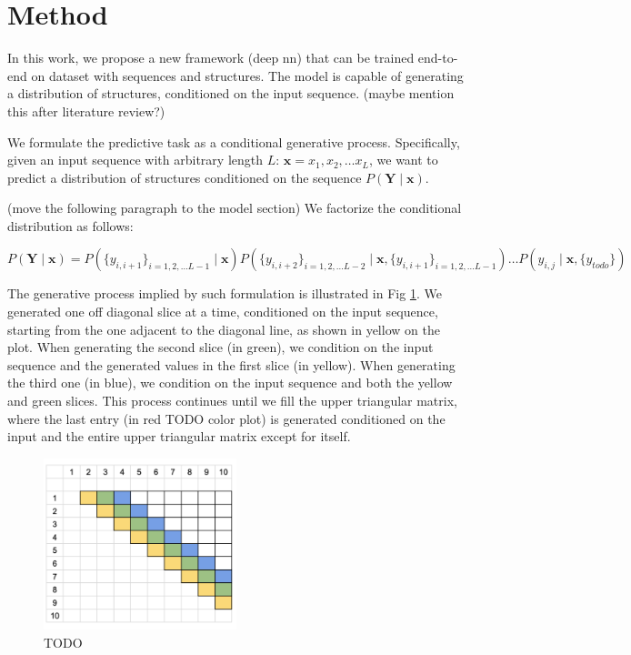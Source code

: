 \documentclass{article}
\begin{document}
\section{Method}


In this work, we propose a new framework (deep nn) that can be trained end-to-end on dataset with sequences and structures.
The model is capable of generating a distribution of structures, conditioned on the input sequence.
(maybe mention this after literature review?)

We formulate the predictive task as a conditional generative process.
Specifically, given an input sequence with arbitrary length $L$: $\bm{x} = x_1, x_2, \dots x_{L}$,
we want to predict a distribution of structures conditioned on the sequence $P(\bm{Y} \mid \bm{x})$.


(move the following paragraph to the model section)
We factorize the conditional distribution as follows:

$$
P(\bm{Y} \mid \bm{x}) = P(\{y_{i, i+1}\}_{i=1, 2, \dots L-1} \mid \bm{x})
P(\{y_{i, i+2}\}_{i=1, 2, \dots L-2} \mid \bm{x}, \{y_{i, i+1}\}_{i=1, 2, \dots L-1})
\dots
P(y_{i, j} \mid \bm{x}, \{y_{todo}\})
$$

The generative process implied by such formulation is illustrated in Fig \ref{fig:autoregressive_direction}.
We generated one off diagonal slice at a time, conditioned on the input sequence,
starting from the one adjacent to the diagonal line, as shown in yellow on the plot.
When generating the second slice (in green), we condition on the input sequence and the generated values in the first slice (in yellow).
When generating the third one (in blue), we condition on the input sequence and both the yellow and green slices.
This process continues until we fill the upper triangular matrix,
where the last entry (in red TODO color plot) is generated conditioned on the input and the entire upper triangular matrix except for itself.

\begin{figure}[h!]
    \centering
    \includegraphics[width=0.5\textwidth]{plot/autoregressive_direction.png}
    \caption{TODO}
    \label{fig:autoregressive_direction}
    \centering
\end{figure}
\end{document}

